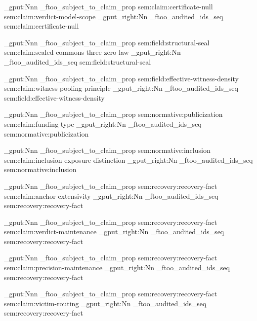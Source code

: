 \prop_gput:Nnn \g_ftoo_subject_to_claim_prop { sem:claim:certificate-null } { sem:claim:verdict-model-scope }
\seq_gput_right:Nn \g_ftoo_audited_ids_seq { sem:claim:certificate-null }

\prop_gput:Nnn \g_ftoo_subject_to_claim_prop { sem:field:structural-seal } { sem:claim:sealed-commons-three-zero-law }
\seq_gput_right:Nn \g_ftoo_audited_ids_seq { sem:field:structural-seal }

\prop_gput:Nnn \g_ftoo_subject_to_claim_prop { sem:field:effective-witness-density } { sem:claim:witness-pooling-principle }
\seq_gput_right:Nn \g_ftoo_audited_ids_seq { sem:field:effective-witness-density }

\prop_gput:Nnn \g_ftoo_subject_to_claim_prop { sem:normative:publicization } { sem:claim:funding-type }
\seq_gput_right:Nn \g_ftoo_audited_ids_seq { sem:normative:publicization }

\prop_gput:Nnn \g_ftoo_subject_to_claim_prop { sem:normative:inclusion } { sem:claim:inclusion-exposure-distinction }
\seq_gput_right:Nn \g_ftoo_audited_ids_seq { sem:normative:inclusion }

\prop_gput:Nnn \g_ftoo_subject_to_claim_prop { sem:recovery:recovery-fact } { sem:claim:anchor-extensivity }
\seq_gput_right:Nn \g_ftoo_audited_ids_seq { sem:recovery:recovery-fact }

\prop_gput:Nnn \g_ftoo_subject_to_claim_prop { sem:recovery:recovery-fact } { sem:claim:verdict-maintenance }
\seq_gput_right:Nn \g_ftoo_audited_ids_seq { sem:recovery:recovery-fact }

\prop_gput:Nnn \g_ftoo_subject_to_claim_prop { sem:recovery:recovery-fact } { sem:claim:precision-maintenance }
\seq_gput_right:Nn \g_ftoo_audited_ids_seq { sem:recovery:recovery-fact }

\prop_gput:Nnn \g_ftoo_subject_to_claim_prop { sem:recovery:recovery-fact } { sem:claim:victim-routing }
\seq_gput_right:Nn \g_ftoo_audited_ids_seq { sem:recovery:recovery-fact }


\ExplSyntaxOff

